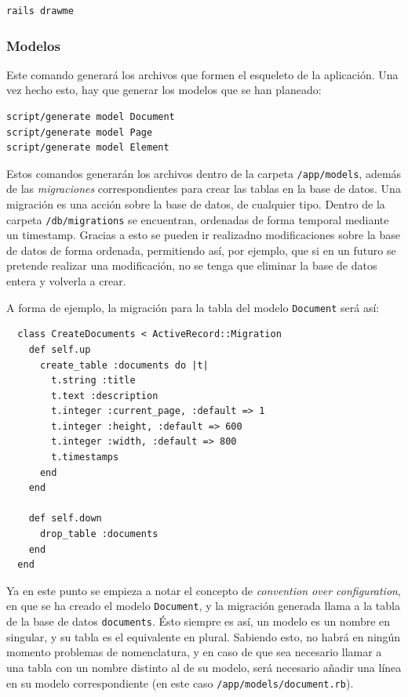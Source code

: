 \begin{verbatim}
rails drawme
\end{verbatim}

\subsubsection{Modelos} %
\label{ssub:modelos}

Este comando generará los archivos que formen el esqueleto de la aplicación. Una vez hecho esto, hay que generar los modelos que se han planeado:

\begin{verbatim}
script/generate model Document
script/generate model Page
script/generate model Element
\end{verbatim}

Estos comandos generarán los archivos dentro de la carpeta \texttt{/app/models}, además de las \emph{migraciones} correspondientes para crear las tablas en la base de datos. Una migración es una acción sobre la base de datos, de cualquier tipo. Dentro de la carpeta \texttt{/db/migrations} se encuentran, ordenadas de forma temporal mediante un timestamp. Gracias a esto se pueden ir realizadno modificaciones sobre la base de datos de forma ordenada, permitiendo así, por ejemplo, que si en un futuro se pretende realizar una modificación, no se tenga que eliminar la base de datos entera y volverla a crear.

A forma de ejemplo, la migración para la tabla del modelo \texttt{Document} será así:

\begin{verbatim}
  class CreateDocuments < ActiveRecord::Migration
    def self.up
      create_table :documents do |t|
        t.string :title
        t.text :description
        t.integer :current_page, :default => 1
        t.integer :height, :default => 600
        t.integer :width, :default => 800
        t.timestamps
      end
    end

    def self.down
      drop_table :documents
    end
  end
\end{verbatim}

Ya en este punto se empieza a notar el concepto de \emph{convention over configuration}, en que se ha creado el modelo \texttt{Document}, y la migración generada llama a la tabla de la base de datos \texttt{documents}. Ésto siempre es así, un modelo es un nombre en singular, y su tabla es el equivalente en plural. Sabiendo esto, no habrá en ningún momento problemas de nomenclatura, y en caso de que sea necesario llamar a una tabla con un nombre distinto al de su modelo, será necesario añadir una línea en su modelo correspondiente (en este caso \texttt{/app/models/document.rb}).


